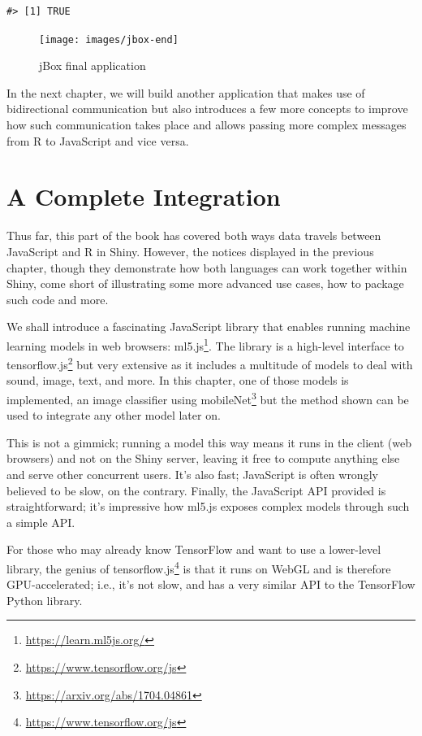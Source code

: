 \documentclass[10pt,]{krantz}
\renewcommand{\href}[2]{#2\footnote{\url{#1}}}
\begin{document}
\begin{verbatim}
#> [1] TRUE
\end{verbatim}

\begin{figure}[H]

{\centering \texttt{[image: images/jbox-end]} 

}

\caption{jBox final application}\label{fig:jbox-end}
\end{figure}

In the next chapter, we will build another application that makes use of bidirectional communication but also introduces a few more concepts to improve how such communication takes place and allows passing more complex messages from R to JavaScript and vice versa.

\hypertarget{shiny-complete}{%
\chapter{A Complete Integration}\label{shiny-complete}}

Thus far, this part of the book has covered both ways data travels between JavaScript and R in Shiny. However, the notices displayed in the previous chapter, though they demonstrate how both languages can work together within Shiny, come short of illustrating some more advanced use cases, how to package such code and more.

We shall introduce a fascinating JavaScript library that enables running machine learning models in web browsers: \href{https://learn.ml5js.org/}{ml5.js}. The library is a high-level interface to \href{https://www.tensorflow.org/js}{tensorflow.js} but very extensive as it includes a multitude of models to deal with sound, image, text, and more. In this chapter, one of those models is implemented, an image classifier using \href{https://arxiv.org/abs/1704.04861}{mobileNet} but the method shown can be used to integrate any other model later on.

This is not a gimmick; running a model this way means it runs in the client (web browsers) and not on the Shiny server, leaving it free to compute anything else and serve other concurrent users. It's also fast; JavaScript is often wrongly believed to be slow, on the contrary. Finally, the JavaScript API provided is straightforward; it's impressive how ml5.js exposes complex models through such a simple API.

For those who may already know TensorFlow and want to use a lower-level library, the genius of \href{https://www.tensorflow.org/js}{tensorflow.js} is that it runs on WebGL and is therefore GPU-accelerated; i.e., it's not slow, and has a very similar API to the TensorFlow Python library.
\end{document}
